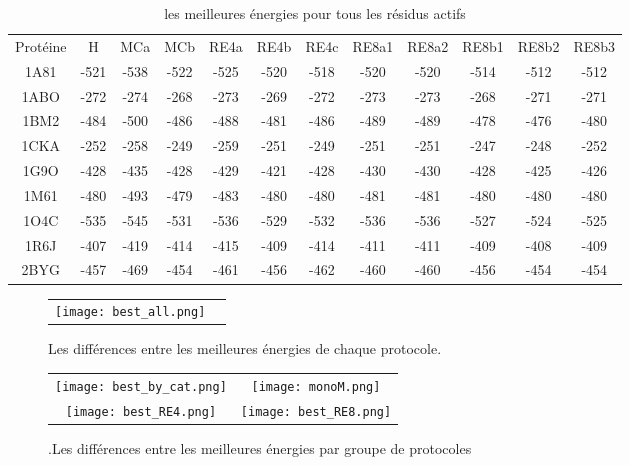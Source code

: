     \begin{table}[h]
      \centering

      \begin{tabular}{cccccccccccc}


        \toprule
        Protéine & H & MCa & MCb & RE4a & RE4b & RE4c & RE8a1 & RE8a2 & RE8b1 & RE8b2 & RE8b3 \\
        \cmidrule{1-12}
        1A81 & -521 & -538 & -522 & -525 & -520 & -518 & -520 & -520 & -514 & -512 & -512 \\
        1ABO & -272 & -274 & -268 & -273 & -269 & -272 & -273 & -273 & -268 & -271 & -271 \\
        1BM2 & -484 & -500 & -486 & -488 & -481 & -486 & -489 & -489 & -478 & -476 & -480 \\
        1CKA & -252 & -258 & -249 & -259 & -251 & -249 & -251 & -251 & -247 & -248 & -252 \\
        1G9O & -428 & -435 & -428 & -429 & -421 & -428 & -430 & -430 & -428 & -425 & -426 \\
        1M61 & -480 & -493 & -479 & -483 & -480 & -480 & -481 & -481 & -480 & -480 & -480 \\
        1O4C & -535 & -545 & -531 & -536 & -529 & -532 & -536 & -536 & -527 & -524 & -525 \\
        1R6J & -407 & -419 & -414 & -415 & -409 & -414 & -411 & -411 & -409 & -408 & -409 \\
        2BYG & -457 & -469 & -454 & -461 & -456 & -462 & -460 & -460 & -456 & -454 & -454 \\
        
        \bottomrule
      \end{tabular}      
      \caption{les meilleures énergies pour tous les résidus actifs}
\label{tab:best_ener_all_all}      
    \end{table}


   \begin{figure}[t]
     \centering
     \begin{tabular}{cc}
       \texttt{[image: best\_all.png]} \\
     \end{tabular}
     \caption{Les différences entre les meilleures énergies de chaque protocole.}
\label{graph:best_ener_all_all}
   \end{figure}


    \clearpage


   \begin{figure}[t]
     \centering
     \begin{tabular}{cc}
       \texttt{[image: best\_by\_cat.png]} &
       \texttt{[image: monoM.png]} \\
       \texttt{[image: best\_RE4.png]} &
       \texttt{[image: best\_RE8.png]} \\
     \end{tabular}
     \caption{.Les différences entre les meilleures énergies par groupe de protocoles}
\label{graph:best_ener_by_algo}
   \end{figure}


